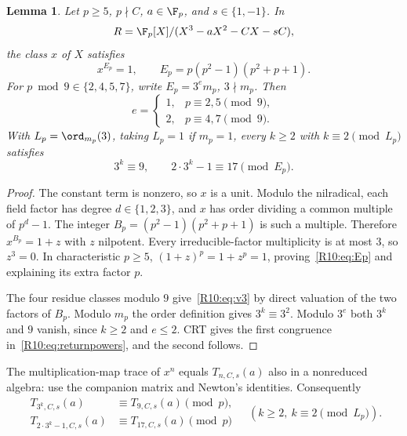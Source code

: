 \documentclass[11pt,a4paper]{article}
\newtheorem{lemma}[theorem]{Lemma}\newtheorem{proposition}[theorem]{Proposition}
\theoremstyle{definition}\newtheorem{definition}[theorem]{Definition}
\theoremstyle{remark}\newtheorem{remark}[theorem]{Remark}
\begin{document}
\begin{lemma}\label{R10:lem:unit-exponent}
Let $p\ge5$, $p\nmid C$, $a\in\F_p$, and $s\in\{1,-1\}$.
In
\[
                 R=\F_p[X]/(X^3-aX^2-CX-sC),
\]
the class $x$ of $X$ satisfies
\begin{equation}\label{R10:eq:Ep}
              x^{E_p}=1,\qquad E_p=p(p^2-1)(p^2+p+1).
\end{equation}
For $p\bmod9\in\{2,4,5,7\}$, write $E_p=3^e m_p$, $3\nmid m_p$.
Then
\begin{equation}\label{R10:eq:v3}
 e=\begin{cases}1,&p\equiv2,5\pmod9,\\2,&p\equiv4,7\pmod9.\end{cases}
\end{equation}
With $L_p=\ord_{m_p}(3)$, taking $L_p=1$ if $m_p=1$, every
$k\ge2$ with $k\equiv2\pmod{L_p}$ satisfies
\begin{equation}\label{R10:eq:returnpowers}
                  3^k\equiv9,\qquad 2\cdot3^k-1\equiv17\pmod{E_p}.
\end{equation}
\end{lemma}
\begin{proof}
The constant term is nonzero, so $x$ is a unit.
Modulo the nilradical, each field factor has degree $d\in\{1,2,3\}$,
and $x$ has order dividing a common multiple of $p^d-1$.
The integer $B_p=(p^2-1)(p^2+p+1)$ is such a multiple.
Therefore $x^{B_p}=1+z$ with $z$ nilpotent.
Every irreducible-factor multiplicity is at most $3$, so $z^3=0$.
In characteristic $p\ge5$, $(1+z)^p=1+z^p=1$,
proving~\eqref{R10:eq:Ep} and explaining its extra factor $p$.

The four residue classes modulo $9$ give~\eqref{R10:eq:v3} by direct
valuation of the two factors of $B_p$.
Modulo $m_p$ the order definition gives $3^k\equiv3^2$.
Modulo $3^e$ both $3^k$ and $9$ vanish, since $k\ge2$ and $e\le2$.
CRT gives the first congruence in~\eqref{R10:eq:returnpowers}, and the second follows.
\end{proof}

The multiplication-map trace of $x^n$ equals $T_{n,C,s}(a)$ also
in a nonreduced algebra: use the companion matrix and Newton's identities.
Consequently
\begin{equation}\label{R10:eq:returntraces}
 \begin{aligned}
 T_{3^k,C,s}(a)&\equiv T_{9,C,s}(a)\pmod p,\\
 T_{2\cdot3^k-1,C,s}(a)&\equiv T_{17,C,s}(a)\pmod p
 \end{aligned}
 \quad(k\ge2,\ k\equiv2\pmod{L_p}).
\end{equation}
\end{document}
